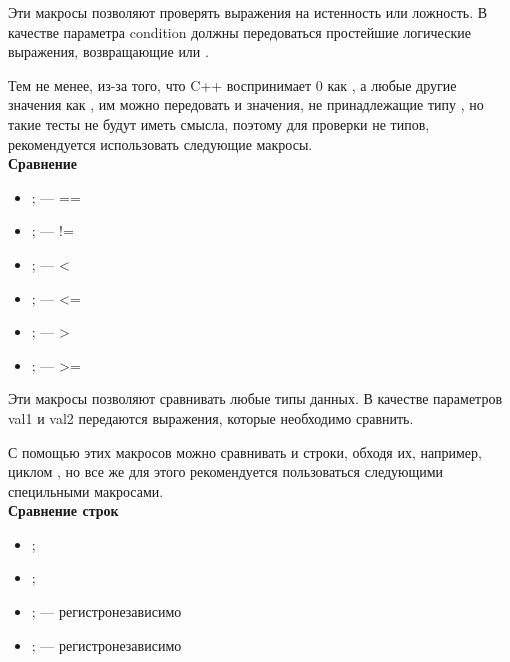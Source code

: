\documentclass[a4paper, 11pt]{article}
\newcommand{\assertiontype}[1]{{\large \bfseries #1}}
\begin{document}
	 Эти макросы позволяют проверять выражения на истенность или ложность. В качестве параметра condition должны передоваться простейшие логические выражения, возвращающие  или .
	 
	 
	 Тем не менее, из-за того, что C++ воспринимает 0 как , а любые другие значения как , им можно передовать и значения, не принадлежащие типу , но такие тесты не будут иметь смысла, поэтому для проверки не  типов, рекомендуется использовать следующие макросы.\\
	
	\assertiontype{Сравнение}
	
	\begin{itemize}
		\item {}; --- ==
		\item {}; --- !=
		\item {}; --- <
		\item {}; --- <=
		\item {}; --- >
		\item {}; --- >=
	\end{itemize}
	
	Эти макросы позволяют сравнивать любые типы данных. В качестве параметров val1 и val2 передаются выражения, которые необходимо сравнить.
	
	
	С помощью этих макросов можно сравнивать и строки, обходя их, например, циклом , но все же для этого рекомендуется пользоваться следующими специльными макросами.\\
	
	\assertiontype{Сравнение строк}
	
	\begin{itemize}
		\item {};
		\item {};
		\item {}; --- регистронезависимо
		\item {}; --- регистронезависимо
	\end{itemize}
\end{document}
